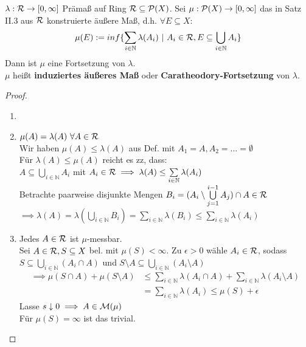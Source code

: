   \begin{theorem}
    $\lambda: \mathcal{R} \to [0, \infty]$ Prämaß auf Ring $\mathcal{R} \subseteq \mathcal{P}(X)$. Sei $\mu: \mathcal{P}(X) \to [0, \infty]$ das in Satz II.3 aus $\mathcal{R}$ konstruierte äußere Maß, d.h. $\forall E \subseteq X:$
    \begin{align*}
      \mu(E) := inf\{\sum\limits_{i \in \mathbb{N}} \lambda(A_i) \ | \ A_i \in \script{R}, E \subseteq \bigcup\limits_{i \in \mathbb{N}} A_i\}
    \end{align*}
    Dann ist $\mu$ eine Fortsetzung von $\lambda$.\\
    $\mu$ heißt \textbf{induziertes äußeres Maß} oder \textbf{Caratheodory-Fortsetzung} von $\lambda$.
  \end{theorem}

  \begin{proof}
    \begin{enumerate}[label=\roman*)]
      \item[]
      \item $\mu(A) = \lambda(A) \ \forall A \in \mathcal{R}$\\
            Wir haben $\mu(A) \leq \lambda(A)$ aus Def. mit $A_1 = A, A_2 = ... = \emptyset$\\
            Für $\lambda(A) \leq \mu(A)$ reicht es zz, dass:\\
            $A \subseteq \bigcup\limits_{i \in \mathbb{N}} A_i$ mit $A_i \in \mathcal{R} \implies \lambda(A) \leq \sum\limits_{i \in \mathbb{N}} \lambda(A_i)$\\
            Betrachte paarweise disjunkte Mengen $B_i = (A_i \setminus \bigcup\limits_{j=1}^{i-1} A_j) \cap A \in \mathcal{R}$\\
            $\implies \lambda(A) = \lambda(\bigcup\limits_{i \in \mathbb{N}} B_i) = \sum\limits_{i \in \mathbb{N}} \lambda(B_i) \leq \sum\limits_{i \in \mathbb{N}} \lambda(A_i)$
      \item Jedes $A \in \mathcal{R}$ ist $\mu$-messbar.\\
            Sei $A \in \mathcal{R}, S \subseteq X$ bel. mit $\mu(S) < \infty$. Zu $\epsilon > 0$ wähle $A_i \in \mathcal{R}$, sodass $S \subseteq \bigcup\limits_{i \in \mathbb{N}} (A_i \cap A)$ und $S \setminus A \subseteq \bigcup\limits_{i \in \mathbb{N}} (A_i \setminus A)$
            \begin{align*}
              \implies \mu(S \cap A) + \mu(S \setminus A) 
              &\leq \sum\limits_{i \in \mathbb{N}} \lambda(A_i \cap A) + \sum\limits_{i \in \mathbb{N}} \lambda(A_i \setminus A)\\
              &= \sum\limits_{i \in \mathbb{N}} \lambda(A_i) \leq \mu(S) + \epsilon
            \end{align*}
            Lasse $s \downarrow 0 \implies A \in \mathcal{M}(\mu)$\\
            Für $\mu(S) = \infty$ ist das trivial.
    \end{enumerate}
  \end{proof}

